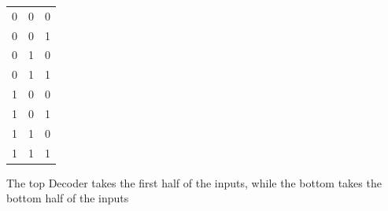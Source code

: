 \documentclass[a4paper,12pt]{article}
\begin{document}
            
            \begin{tabular}{ c c c } 
                \hline
                0 & 0 & 0 \\ 
                0 & 0 & 1 \\ 
                0 & 1 & 0 \\
                0 & 1 & 1 \\
                1 & 0 & 0 \\
                1 & 0 & 1 \\
                1 & 1 & 0 \\
                1 & 1 & 1 \\
                \end{tabular}    
            \leavevmode The top Decoder takes the first half of the inputs, while the bottom takes the bottom half of the inputs
        
\end{document}
